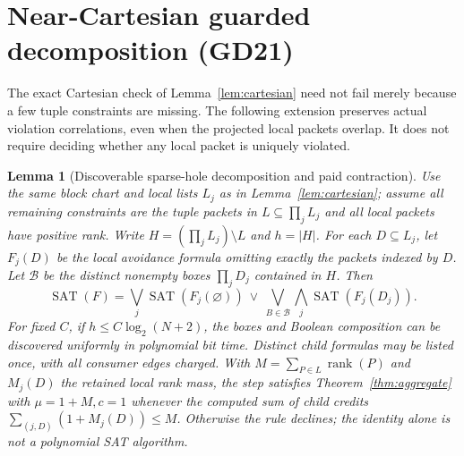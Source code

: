 \documentclass[11pt]{article}
\newtheorem{lemma}[theorem]{Lemma}
\begin{document}
\section{Near-Cartesian guarded decomposition (GD21)}\label{sec:near-cartesian}
The exact Cartesian check of Lemma~\ref{lem:cartesian} need not fail merely because a few tuple constraints are missing. The following extension preserves actual violation correlations, even when the projected local packets overlap. It does not require deciding whether any local packet is uniquely violated.

\begin{lemma}[Discoverable sparse-hole decomposition and paid contraction]\label{lem:holes}
Use the same block chart and local lists $L_j$ as in Lemma~\ref{lem:cartesian}; assume all remaining constraints are the tuple packets in $L\subseteq\prod_j L_j$ and all local packets have positive rank. Write $H=(\prod_j L_j)\setminus L$ and $h=|H|$. For each $D\subseteq L_j$, let $F_j(D)$ be the local avoidance formula omitting exactly the packets indexed by $D$. Let $\mathcal B$ be the distinct nonempty boxes $\prod_j D_j$ contained in $H$. Then
\[
\operatorname{SAT}(F)=\bigvee_j\operatorname{SAT}(F_j(\varnothing))
 \ \lor\ \bigvee_{B\in\mathcal B}\bigwedge_j\operatorname{SAT}(F_j(D_j)).
\]
For fixed $C$, if $h\le C\log_2(N+2)$, the boxes and Boolean composition can be discovered uniformly in polynomial bit time. Distinct child formulas may be listed once, with all consumer edges charged. With $M=\sum_{P\in L}\operatorname{rank}(P)$ and $M_j(D)$ the retained local rank mass, the step satisfies Theorem~\ref{thm:aggregate} with $\mu=1+M,c=1$ whenever the computed sum of child credits $\sum_{(j,D)}(1+M_j(D))\le M$. Otherwise the rule declines; the identity alone is not a polynomial SAT algorithm.
\end{lemma}
\end{document}
